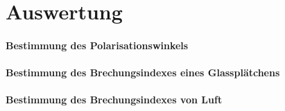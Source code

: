 \section{Auswertung}
\label{sec:Auswertung}
\paragraph{Bestimmung des Polarisationswinkels}

\paragraph{Bestimmung des Brechungsindexes eines Glassplätchens}
\paragraph{Bestimmung des Brechungsindexes von Luft}
